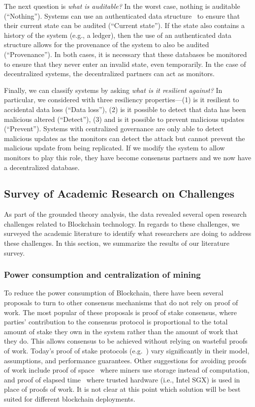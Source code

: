 The next question is \emph{what is auditable?}
In the worst case, nothing is auditable (``Nothing'').
Systems can use an authenticated data structure~\cite{tamassia2003authenticated} to ensure that their current state can be audited (``Current state'').
If the state also contains a history of the system (e.g., a ledger), then the use of an authenticated data structure allows for the provenance of the system to also be audited (``Provenance'').
In both cases, it is necessary that these databases be monitored to ensure that they never enter an invalid state, even temporarily.
In the case of decentralized systems, the decentralized partners can act as monitors.

Finally, we can classify systems by asking \emph{what is it resilient against?}
In particular, we considered with three resiliency properties---(1) is it resilient to accidental data loss (``Data loss''), (2) is it possible to detect that data has been malicious altered (``Detect''), (3) and is it possible to prevent malicious updates (``Prevent'').
Systems with centralized governance are only able to detect malicious updates as the monitors can detect the attack but cannot prevent the malicious update from being replicated.
If we modify the system to allow monitors to play this role, they have become consensus partners and we now have a decentralized database.

\subsection{Survey of Academic Research on Challenges}
As part of the grounded theory analysis, the data revealed several open research challenges related to Blockchain technology.
In regards to these challenges, we surveyed the academic literature to identify what researchers are doing to address these challenges.
In this section, we summarize the results of our literature survey.

\subsubsection{Power consumption and centralization of mining}
To reduce the power consumption of Blockchain, there have been several proposals to turn to other consensus mechanisms that do not rely on proof of work.  The most popular of these proposals is proof of stake consensus, where parties' contribution to the consensus protocol is proportional to the total amount of stake they own in the system rather than the amount of work that they do.  This allows consensus to be achieved without relying on wasteful proofs of work.  Today's proof of stake protocols (e.g.~\cite{FC:BenGabMiz16,eprint:BenPasShi16,CRYPTO:KRDO17,SOSP:GHMVZ17}) vary significantly in their model, assumptions, and performance guarantees.  Other suggestions for avoiding proofs of work include proof of space~\cite{CRYPTO:DFKP15, eprint:PPKAFG15} where miners use storage instead of computation, and proof of elapsed time~\cite{SSS:CXSGLS17} where trusted hardware (i.e., Intel SGX) is used in place of proofs of work.  It is not clear at this point which solution will be best suited for different blockchain deployments.  

